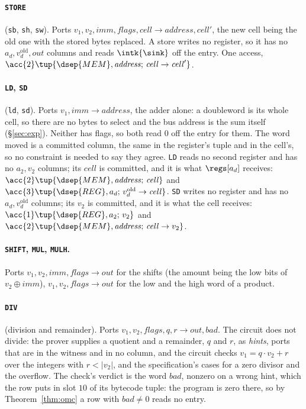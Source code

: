 \paragraph{\texttt{STORE}} (\texttt{sb}, \texttt{sh}, \texttt{sw}). Ports $v_1,v_2,\mathit{imm},\mathit{flags},\mathit{cell}\to\mathit{address},\mathit{cell}'$, the new cell being the old one with the stored bytes replaced. A store writes no register, so it has no $a_d,v_d^{\mathrm{old}},\mathit{out}$ columns and reads $\intk{\sink}$ off the entry. One access, $\acc{2}\tup{\dsep{MEM},\mathit{address};\,\mathit{cell}\to\mathit{cell}'}$.

\paragraph{\texttt{LD}, \texttt{SD}} (\texttt{ld}, \texttt{sd}). Ports $v_1,\mathit{imm}\to\mathit{address}$, the adder alone: a doubleword is its whole cell, so there are no bytes to select and the bus address is the sum itself (\S\ref{sec:exp}). Neither has flags, so both read $0$ off the entry for them. The word moved is a committed column, the same in the register's tuple and in the cell's, so no constraint is needed to say they agree. \texttt{LD} reads no second register and has no $a_2,v_2$ columns; its $\mathit{cell}$ is committed, and it is what $\regs[a_d]$ receives: $\acc{2}\tup{\dsep{MEM},\mathit{address};\,\mathit{cell}}$ and $\acc{3}\tup{\dsep{REG},a_d;\,v_d^{\mathrm{old}}\to\mathit{cell}}$. \texttt{SD} writes no register and has no $a_d,v_d^{\mathrm{old}}$ columns; its $v_2$ is committed, and it is what the cell receives: $\acc{1}\tup{\dsep{REG},a_2;\,v_2}$ and $\acc{2}\tup{\dsep{MEM},\mathit{address};\,\mathit{cell}\to v_2}$.

\paragraph{\texttt{SHIFT}, \texttt{MUL}, \texttt{MULH}.} Ports $v_1,v_2,\mathit{imm},\mathit{flags}\to\mathit{out}$ for the shifts (the amount being the low bits of $v_2\oplus\mathit{imm}$), $v_1,v_2,\mathit{flags}\to\mathit{out}$ for the low and the high word of a product.

\paragraph{\texttt{DIV}} (division and remainder). Ports $v_1,v_2,\mathit{flags},q,r\to\mathit{out},\mathit{bad}$. The circuit does not divide: the prover supplies a quotient and a remainder, $q$ and $r$, as \emph{hints}, ports that are in the witness and in no column, and the circuit checks $v_1=q\cdot v_2+r$ over the integers with $r<|v_2|$, and the specification's cases for a zero divisor and the overflow. The check's verdict is the word $\mathit{bad}$, nonzero on a wrong hint, which the row puts in slot $10$ of its bytecode tuple: the program is zero there, so by Theorem~\ref{thm:omc} a row with $\mathit{bad}\neq0$ reads no entry.

